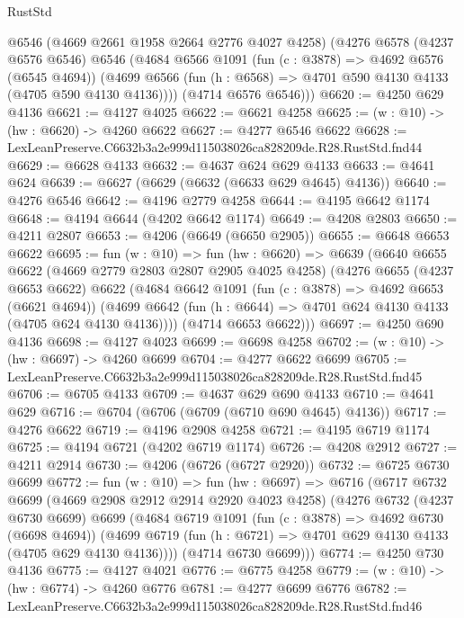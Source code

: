 \begin{lexlean}{RustStd}
\begin{coremodule}
      @6546
      (@4669 @2661 @1958 @2664 @2776 @4027 @4258)
      (@4276
        @6578
        (@4237 @6576 @6546)
        @6546
        (@4684
          @6566
          @1091
          (fun (c : @3878) => @4692 @6576 (@6545 @4694))
          (@4699 @6566 (fun (h : @6568) => @4701 @590 @4130 @4133 (@4705 @590 @4130 @4136))))
        (@4714 @6576 @6546)))
@6620 := @4250 @629 @4136
@6621 := @4127 @4025
@6622 := @6621 @4258
@6625 := (w : @10) -> (hw : @6620) -> @4260 @6622
@6627 := @4277 @6546 @6622
@6628 := LexLeanPreserve.C6632b3a2e999d115038026ca828209de.R28.RustStd.fnd44
@6629 := @6628 @4133
@6632 := @4637 @624 @629 @4133
@6633 := @4641 @624
@6639 := @6627 (@6629 (@6632 (@6633 @629 @4645) @4136))
@6640 := @4276 @6546
@6642 := @4196 @2779 @4258
@6644 := @4195 @6642 @1174
@6648 := @4194 @6644 (@4202 @6642 @1174)
@6649 := @4208 @2803
@6650 := @4211 @2807
@6653 := @4206 (@6649 (@6650 @2905))
@6655 := @6648 @6653 @6622
@6695 := fun (w : @10) =>
  fun (hw : @6620) =>
  @6639
    (@6640
      @6655
      @6622
      (@4669 @2779 @2803 @2807 @2905 @4025 @4258)
      (@4276
        @6655
        (@4237 @6653 @6622)
        @6622
        (@4684
          @6642
          @1091
          (fun (c : @3878) => @4692 @6653 (@6621 @4694))
          (@4699 @6642 (fun (h : @6644) => @4701 @624 @4130 @4133 (@4705 @624 @4130 @4136))))
        (@4714 @6653 @6622)))
@6697 := @4250 @690 @4136
@6698 := @4127 @4023
@6699 := @6698 @4258
@6702 := (w : @10) -> (hw : @6697) -> @4260 @6699
@6704 := @4277 @6622 @6699
@6705 := LexLeanPreserve.C6632b3a2e999d115038026ca828209de.R28.RustStd.fnd45
@6706 := @6705 @4133
@6709 := @4637 @629 @690 @4133
@6710 := @4641 @629
@6716 := @6704 (@6706 (@6709 (@6710 @690 @4645) @4136))
@6717 := @4276 @6622
@6719 := @4196 @2908 @4258
@6721 := @4195 @6719 @1174
@6725 := @4194 @6721 (@4202 @6719 @1174)
@6726 := @4208 @2912
@6727 := @4211 @2914
@6730 := @4206 (@6726 (@6727 @2920))
@6732 := @6725 @6730 @6699
@6772 := fun (w : @10) =>
  fun (hw : @6697) =>
  @6716
    (@6717
      @6732
      @6699
      (@4669 @2908 @2912 @2914 @2920 @4023 @4258)
      (@4276
        @6732
        (@4237 @6730 @6699)
        @6699
        (@4684
          @6719
          @1091
          (fun (c : @3878) => @4692 @6730 (@6698 @4694))
          (@4699 @6719 (fun (h : @6721) => @4701 @629 @4130 @4133 (@4705 @629 @4130 @4136))))
        (@4714 @6730 @6699)))
@6774 := @4250 @730 @4136
@6775 := @4127 @4021
@6776 := @6775 @4258
@6779 := (w : @10) -> (hw : @6774) -> @4260 @6776
@6781 := @4277 @6699 @6776
@6782 := LexLeanPreserve.C6632b3a2e999d115038026ca828209de.R28.RustStd.fnd46

\end{coremodule}
\end{lexlean}
